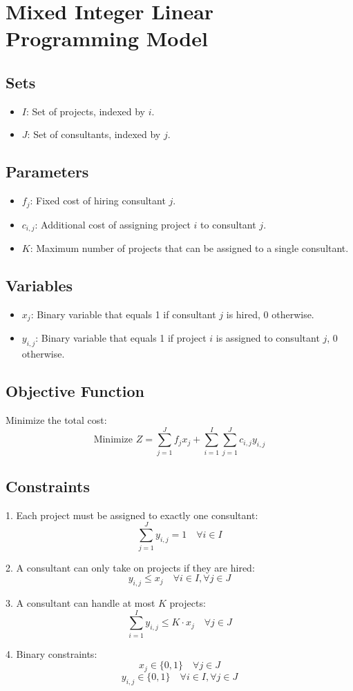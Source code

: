 \documentclass{article}
\begin{document}
\section*{Mixed Integer Linear Programming Model}

\subsection*{Sets}
\begin{itemize}
    \item \( I \): Set of projects, indexed by \( i \).
    \item \( J \): Set of consultants, indexed by \( j \).
\end{itemize}

\subsection*{Parameters}
\begin{itemize}
    \item \( f_j \): Fixed cost of hiring consultant \( j \).
    \item \( c_{i,j} \): Additional cost of assigning project \( i \) to consultant \( j \).
    \item \( K \): Maximum number of projects that can be assigned to a single consultant.
\end{itemize}

\subsection*{Variables}
\begin{itemize}
    \item \( x_j \): Binary variable that equals 1 if consultant \( j \) is hired, 0 otherwise.
    \item \( y_{i,j} \): Binary variable that equals 1 if project \( i \) is assigned to consultant \( j \), 0 otherwise.
\end{itemize}

\subsection*{Objective Function}
Minimize the total cost:
\[
\text{Minimize } Z = \sum_{j=1}^{J} f_j x_j + \sum_{i=1}^{I} \sum_{j=1}^{J} c_{i,j} y_{i,j}
\]

\subsection*{Constraints}
1. Each project must be assigned to exactly one consultant:
\[
\sum_{j=1}^{J} y_{i,j} = 1 \quad \forall i \in I
\]
  
2. A consultant can only take on projects if they are hired:
\[
y_{i,j} \leq x_j \quad \forall i \in I, \forall j \in J
\]

3. A consultant can handle at most \( K \) projects:
\[
\sum_{i=1}^{I} y_{i,j} \leq K \cdot x_j \quad \forall j \in J
\]

4. Binary constraints:
\[
x_j \in \{0, 1\} \quad \forall j \in J
\]
\[
y_{i,j} \in \{0, 1\} \quad \forall i \in I, \forall j \in J
\]
\end{document}
